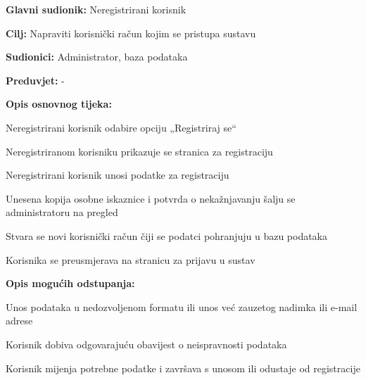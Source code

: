 							\noindent {}
						\begin{packed_item}
							
							\item \textbf{Glavni sudionik: } Neregistrirani korisnik
							\item  \textbf{Cilj:} Napraviti korisnički račun kojim se pristupa sustavu
							\item  \textbf{Sudionici:} Administrator, baza podataka
							\item  \textbf{Preduvjet:} -
							\item  \textbf{Opis osnovnog tijeka:}
							
							\item[] \begin{packed_enum}
								
								\item Neregistrirani korisnik odabire opciju „Registriraj se“ 
								\item Neregistriranom korisniku prikazuje se stranica za registraciju 
								\item Neregistrirani korisnik unosi podatke za registraciju 
								\item Unesena kopija osobne iskaznice i potvrda o nekažnjavanju šalju se administratoru na pregled 
								\item Stvara se novi korisnički račun čiji se podatci pohranjuju u bazu podataka 
								\item Korisnika se preusmjerava na stranicu za prijavu u sustav 
								
							\end{packed_enum}
							
							\item  \textbf{Opis mogućih odstupanja:}
							
							\item[] \begin{packed_item}
								
								\item[3.a] Unos podataka u nedozvoljenom formatu ili unos već zauzetog nadimka ili e-mail adrese 
								\item[] \begin{packed_enum}
									
									\item Korisnik dobiva odgovarajuću obavijest o neispravnosti podataka 
									\item Korisnik mijenja potrebne podatke i završava s unosom ili odustaje od registracije 
									
								\end{packed_enum}
								
								
							\end{packed_item}
						\end{packed_item}
